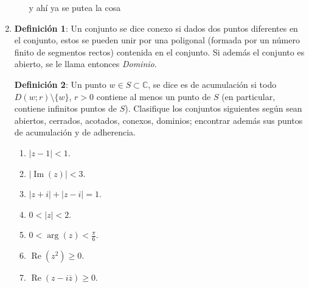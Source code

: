 \documentclass[11pt]{article}
\begin{document}
\begin{enumerate}
\begin{enumerate}
        y ahí ya se putea la cosa
    \end{enumerate}

    \item \textbf{Definición 1}: Un conjunto se dice conexo si dados dos puntos diferentes en el conjunto, estos se pueden unir por una poligonal (formada por un número finito de segmentos rectos) contenida en el conjunto. Si además el conjunto es abierto, se le llama entonces \textit{Dominio}.

    \textbf{Definición 2}: Un punto $w \in S \subset \mathbb{C}$, se dice es de acumulación si todo $D(w; r) \setminus \{w\}$, $r > 0$ contiene al menos un punto de $S$ (en particular, contiene infinitos puntos de $S$). Clasifique los conjuntos siguientes según sean abiertos, cerrados, acotados, conexos, dominios; encontrar además sus puntos de acumulación y de adherencia.
    \begin{enumerate}
        \item $|z - 1| < 1$.

        

        \item $|\operatorname{Im}(z)| < 3$.
        


        \item $|z + i| + |z - i| = 1$.



        \item $0 < |z| < 2$.
        


        \item $0 < \arg(z) < \frac{\pi}{6}$.
        


        \item $\operatorname{Re}(z^2) \geq 0$.
        


        \item $\operatorname{Re}(z - i \overline{z}) \geq 0$.
    \end{enumerate}
\end{enumerate}
\end{document}
